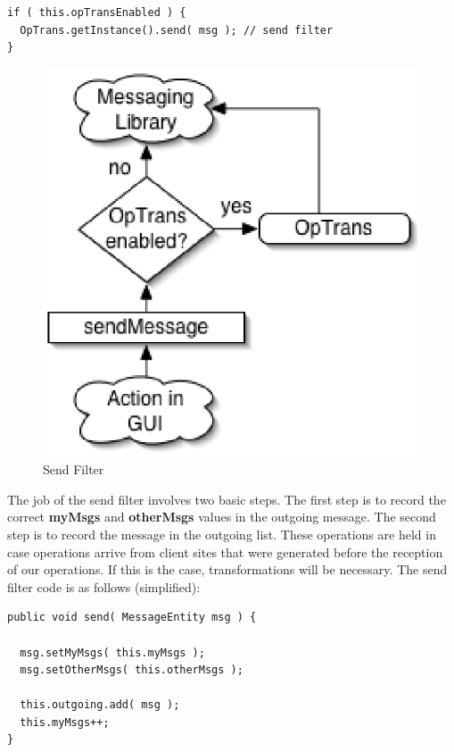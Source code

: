 \documentclass{article}
\begin{document}
\begin{verbatim}
if ( this.opTransEnabled ) {
  OpTrans.getInstance().send( msg ); // send filter
}
\end{verbatim}

\begin{figure}[h]
\begin{center}
\includegraphics{send.eps}
\caption{Send Filter} \label{send}
\end{center}
\end{figure}

The job of the send filter involves two basic steps.  The first
step is to record the correct \textbf{myMsgs} and \textbf{otherMsgs}
values in the
outgoing message.  The second step is to record the message
in the outgoing list.  These operations are held in case operations
arrive from client sites that were generated before the reception of
our operations.  If this is the case, transformations will be
necessary.  The send filter code is as follows (simplified):

\begin{verbatim}
public void send( MessageEntity msg ) {

  msg.setMyMsgs( this.myMsgs );
  msg.setOtherMsgs( this.otherMsgs );

  this.outgoing.add( msg );
  this.myMsgs++;
}
\end{verbatim}
\end{document}
